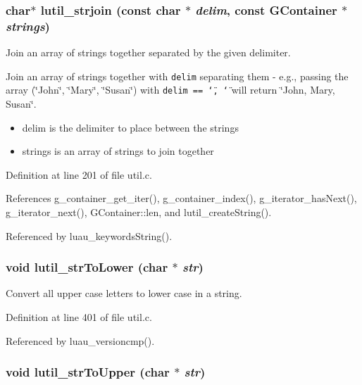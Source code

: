 \subsubsection{\setlength{\rightskip}{0pt plus 5cm}char$\ast$ lutil\_\-strjoin (const char $\ast$ {\em delim}, const {\bf GContainer} $\ast$ {\em strings})}\label{util_8c_a5}


Join an array of strings together separated by the given delimiter. 

Join an array of strings together with {\tt delim} separating them - e.g., passing the array (\char`\"{}John\char`\"{}, \char`\"{}Mary\char`\"{}, \char`\"{}Susan\char`\"{}) with {\tt delim == \char`\"{}, \char`\"{}} will return \char`\"{}John, Mary, Susan\char`\"{}.

\begin{itemize}
\item delim is the delimiter to place between the strings \item strings is an array of strings to join together 
\end{itemize}


Definition at line 201 of file util.c.

References g\_\-container\_\-get\_\-iter(), g\_\-container\_\-index(), g\_\-iterator\_\-has\-Next(), g\_\-iterator\_\-next(), GContainer::len, and lutil\_\-create\-String().

Referenced by luau\_\-keywords\-String().
\subsubsection{\setlength{\rightskip}{0pt plus 5cm}void lutil\_\-str\-To\-Lower (char $\ast$ {\em str})}\label{util_8c_a11}


Convert all upper case letters to lower case in a string. 



Definition at line 401 of file util.c.

Referenced by luau\_\-versioncmp().
\subsubsection{\setlength{\rightskip}{0pt plus 5cm}void lutil\_\-str\-To\-Upper (char $\ast$ {\em str})}\label{util_8c_a12}




